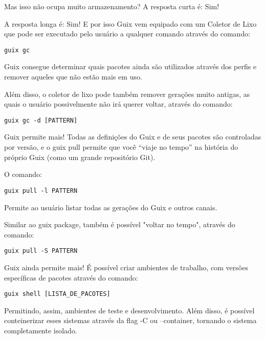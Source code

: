 \documentclass[bigger]{beamer}
\begin{document}
\begin{frame}[label={sec:orgdd0cd8a},fragile]{Mas isso não ocupa muito armazenamento?}
 A resposta curta é: Sim!

A resposta longa é: Sim! E por isso Guix vem equipado com um Coletor de Lixo que pode ser executado pelo
usuário a qualquer comando através do comando:
\begin{verbatim}
guix gc
\end{verbatim}

Guix consegue determinar quais pacotes ainda são utilizados através dos perfis e remover aqueles que
não estão mais em uso.

Além disso, o coletor de lixo pode também remover gerações muito antigas, as quais o usuário possivelmente não
irá querer voltar, através do comando:
\begin{verbatim}
guix gc -d [PATTERN]
\end{verbatim}
\end{frame}
\begin{frame}[label={sec:orgeb2b8c7},fragile]{Guix permite mais!}
 Todas as definições do Guix e de seus pacotes são controladas por versão, e o guix pull permite que você
“viaje no tempo” na história do próprio Guix (como um grande repositório Git).

O comando:
\begin{verbatim}
guix pull -l PATTERN
\end{verbatim}
Permite ao usuário listar todas as gerações do Guix e outros canais.

Similar ao guix package, também é possível "voltar no tempo", através do comando:
\begin{verbatim}
guix pull -S PATTERN
\end{verbatim}
\end{frame}
\begin{frame}[label={sec:orgbcb4ba6},fragile]{Guix ainda permite mais!}
 É possível criar ambientes de trabalho, com versões específicas de pacotes através do comando:
\begin{verbatim}
guix shell [LISTA_DE_PACOTES]
\end{verbatim}

Permitindo, assim, ambientes de teste e desenvolvimento. Além disso, é possível conteinerizar esses sistemas
através da flag -C ou --container, tornando o sistema completamente isolado.
\end{frame}
\end{document}
